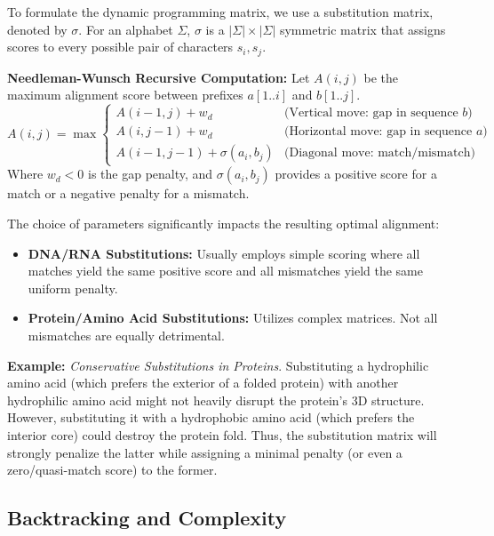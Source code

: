 \documentclass[11pt, a4paper]{article}
\newenvironment{important}
  {\begin{tcolorbox}[colback=blue!5!white, colframe=blue!75!black, arc=1mm, boxrule=1pt]}
  {\end{tcolorbox}}
\begin{document}
To formulate the dynamic programming matrix, we use a substitution matrix, denoted by $\sigma$. For an alphabet $\Sigma$, $\sigma$ is a $|\Sigma| \times |\Sigma|$ symmetric matrix that assigns scores to every possible pair of characters $s_i, s_j$.

\begin{important}
  \textbf{Needleman-Wunsch Recursive Computation:}
  Let $A(i,j)$ be the maximum alignment score between prefixes $a[1..i]$ and $b[1..j]$.
  \[
  A(i, j) = \max \begin{cases} 
      A(i-1, j) + w_d & \text{(Vertical move: gap in sequence } b \text{)} \\
      A(i, j-1) + w_d & \text{(Horizontal move: gap in sequence } a \text{)} \\
      A(i-1, j-1) + \sigma(a_i, b_j) & \text{(Diagonal move: match/mismatch)}
   \end{cases}
  \]
  Where $w_d < 0$ is the gap penalty, and $\sigma(a_i, b_j)$ provides a positive score for a match or a negative penalty for a mismatch.
\end{important}

The choice of parameters significantly impacts the resulting optimal alignment:
\begin{itemize}
    \item \textbf{DNA/RNA Substitutions:} Usually employs simple scoring where all matches yield the same positive score and all mismatches yield the same uniform penalty.
    \item \textbf{Protein/Amino Acid Substitutions:} Utilizes complex matrices. Not all mismatches are equally detrimental. 
\end{itemize}

\textbf{Example:} \textit{Conservative Substitutions in Proteins}. Substituting a hydrophilic amino acid (which prefers the exterior of a folded protein) with another hydrophilic amino acid might not heavily disrupt the protein's 3D structure. However, substituting it with a hydrophobic amino acid (which prefers the interior core) could destroy the protein fold. Thus, the substitution matrix will strongly penalize the latter while assigning a minimal penalty (or even a zero/quasi-match score) to the former.

\subsection{Backtracking and Complexity}
\end{document}
